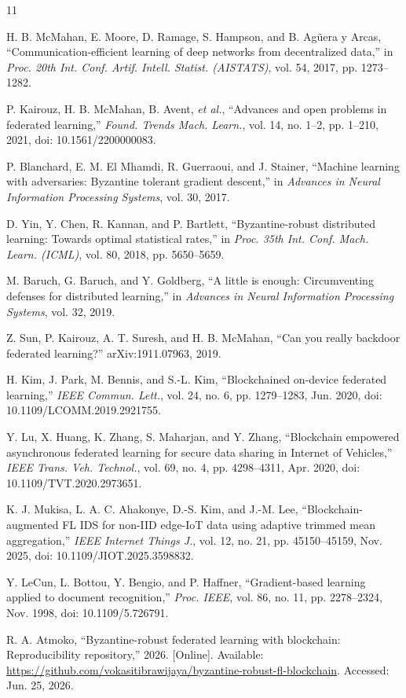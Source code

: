 \documentclass[10pt,letterpaper]{article}
\begin{document}
\small
\begin{thebibliography}{11}

H. B. McMahan, E. Moore, D. Ramage, S. Hampson, and B. Ag\"uera y Arcas,
``Communication-efficient learning of deep networks from decentralized data,''
in \emph{Proc. 20th Int. Conf. Artif. Intell. Statist. (AISTATS)}, vol. 54,
2017, pp. 1273--1282.

P. Kairouz, H. B. McMahan, B. Avent, \emph{et al.},
``Advances and open problems in federated learning,''
\emph{Found. Trends Mach. Learn.}, vol. 14, no. 1--2, pp. 1--210, 2021,
doi: 10.1561/2200000083.

P. Blanchard, E. M. El Mhamdi, R. Guerraoui, and J. Stainer,
``Machine learning with adversaries: Byzantine tolerant gradient descent,''
in \emph{Advances in Neural Information Processing Systems}, vol. 30, 2017.

D. Yin, Y. Chen, R. Kannan, and P. Bartlett,
``Byzantine-robust distributed learning: Towards optimal statistical rates,''
in \emph{Proc. 35th Int. Conf. Mach. Learn. (ICML)}, vol. 80, 2018,
pp. 5650--5659.

M. Baruch, G. Baruch, and Y. Goldberg,
``A little is enough: Circumventing defenses for distributed learning,''
in \emph{Advances in Neural Information Processing Systems}, vol. 32, 2019.

Z. Sun, P. Kairouz, A. T. Suresh, and H. B. McMahan,
``Can you really backdoor federated learning?''
arXiv:1911.07963, 2019.

H. Kim, J. Park, M. Bennis, and S.-L. Kim,
``Blockchained on-device federated learning,''
\emph{IEEE Commun. Lett.}, vol. 24, no. 6, pp. 1279--1283, Jun. 2020,
doi: 10.1109/LCOMM.2019.2921755.

Y. Lu, X. Huang, K. Zhang, S. Maharjan, and Y. Zhang,
``Blockchain empowered asynchronous federated learning for secure data sharing
in Internet of Vehicles,''
\emph{IEEE Trans. Veh. Technol.}, vol. 69, no. 4, pp. 4298--4311, Apr. 2020,
doi: 10.1109/TVT.2020.2973651.

K. J. Mukisa, L. A. C. Ahakonye, D.-S. Kim, and J.-M. Lee,
``Blockchain-augmented FL IDS for non-IID edge-IoT data using adaptive trimmed
mean aggregation,''
\emph{IEEE Internet Things J.}, vol. 12, no. 21, pp. 45150--45159, Nov. 2025,
doi: 10.1109/JIOT.2025.3598832.

Y. LeCun, L. Bottou, Y. Bengio, and P. Haffner,
``Gradient-based learning applied to document recognition,''
\emph{Proc. IEEE}, vol. 86, no. 11, pp. 2278--2324, Nov. 1998,
doi: 10.1109/5.726791.

R. A. Atmoko, ``Byzantine-robust federated learning with blockchain:
Reproducibility repository,'' 2026. [Online]. Available:
\url{https://github.com/vokasitibrawijaya/byzantine-robust-fl-blockchain}.
Accessed: Jun. 25, 2026.

\end{thebibliography}
\end{document}
